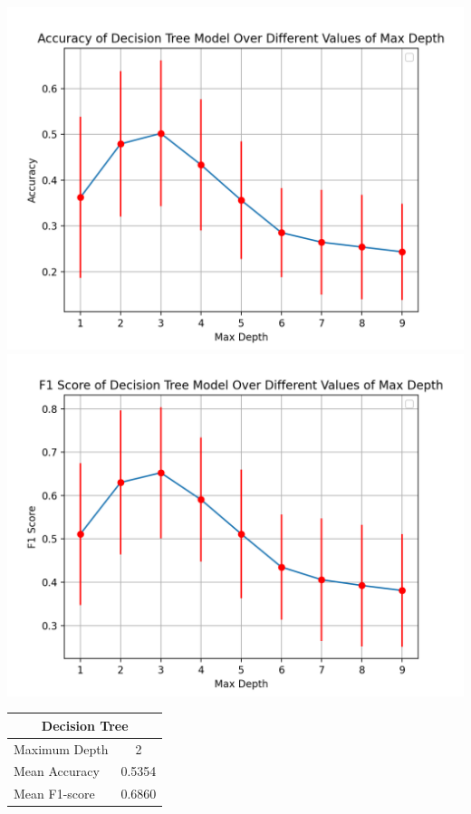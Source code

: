\documentclass{article}
\begin{document}
\begin{minipage}{0.49\textwidth}
    \centering 
    
    \includegraphics*[width=\textwidth]{./src/figures/Accuracy Loan.png}
    \includegraphics*[width=\textwidth]{./src/figures/F-Score Loan.png}

    \centering
    \begin{tabular}{lc}
        \toprule
        \multicolumn{2}{c}{Decision Tree} \\
        \midrule
        Maximum Depth & 2 \\
        Mean Accuracy & 0.5354 \\
        Mean F1-score & 0.6860 \\
        \bottomrule
    \end{tabular}
\end{minipage}
\end{document}
